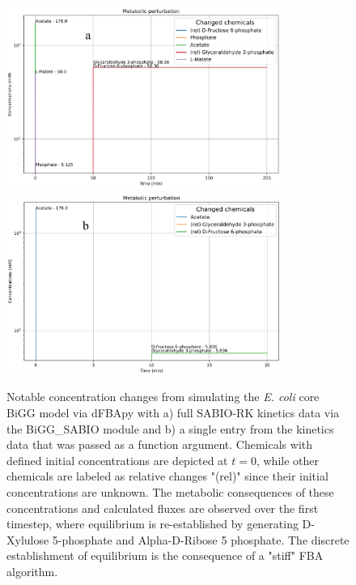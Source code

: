 \begin{figure}
    \centering
    \includegraphics[width = 0.8\textwidth]{images/WCMpy/SABIO_dfba.png} \\
    \includegraphics[width = 0.8\textwidth]{images/WCMpy/simple_argument.png}
    \caption{
        Notable concentration changes from simulating the \textit{E. coli} core BiGG model via dFBApy with a) full SABIO-RK kinetics data via the BiGG\_SABIO module and b) a single entry from the kinetics data that was passed as a function argument. Chemicals with defined initial concentrations are depicted at $t=0$, while other chemicals are labeled as relative changes "(rel)" since their initial concentrations are unknown. The metabolic consequences of these concentrations and calculated fluxes are observed over the first timestep, where equilibrium is re-established by generating D-Xylulose 5-phosphate and Alpha-D-Ribose 5 phosphate. The discrete establishment of equilibrium is the consequence of a "stiff" FBA algorithm. 
    }
    \label{dfba}
\end{figure}

